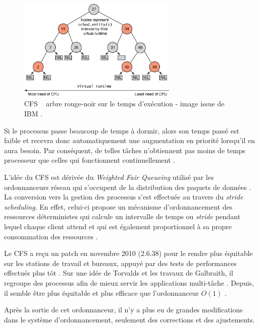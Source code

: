 \documentclass[letterpaper]{article}
\begin{document}
\begin{figure}[t]
\begin{center}
\includegraphics[width=3.0in]{figure1.png}
\caption{\og CFS \fg ~ arbre rouge-noir sur le temps d'exécution - image issue de IBM \citep{jones2009inside}.}
\label{fig1}
\end{center}
\end{figure}

Si le processus passe beaucoup de temps à dormir, alors son temps passé est faible et recevra donc automatiquement une augmentation en priorité lorsqu'il en aura besoin. Par conséquent, de telles tâches n'obtiennent pas moins de temps processeur que celles qui fonctionnent continuellement \citep{Wong:2008:TAF:1400097.1400102}.

L'idée du CFS est dérivée du \textit{Weighted Fair Queueing} utilisé par les ordonnanceurs réseau qui s'occupent de la distribution des paquets de données \citep{Demers:1989:ASF:75247.75248}. La conversion vers la gestion des processus s'est effectuée au travers du \textit{stride scheduling}. En effet, celui-ci propose un mécanisme d'ordonnancement des ressources déterministes qui calcule un intervalle de temps ou \textit{stride} pendant lequel chaque client attend et qui est également proportionnel à sa propre consommation des ressources \citep{Waldspurger:1995:LSS:888601}.

Le CFS a reçu un patch en novembre 2010 (2.6.38) pour le rendre plus équitable sur les stations de travail et bureaux, appuyé par des tests de performances effectués plus tôt \citep{7280991}. Sur une idée de Torvalds et les travaux de Galbraith, il regroupe des processus afin de mieux servir les applications multi-tâche \citep{Wong:2008:TAF:1400097.1400102}. Depuis, il semble être plus équitable et plus efficace que l'ordonnanceur $O(1)$ \citep{4631872}.

Après la sortie de cet ordonnanceur, il n'y a plus eu de grandes modifications dans le système d'ordonnancement, seulement des corrections et des ajustements.
\end{document}
